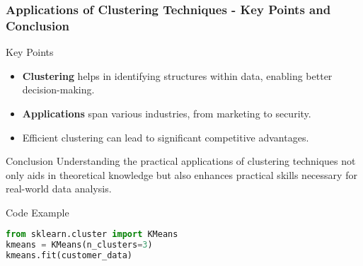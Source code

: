 \documentclass[aspectratio=169]{beamer}
\begin{document}
\begin{frame}[fragile]
    \frametitle{Applications of Clustering Techniques - Key Points and Conclusion}
    \begin{block}{Key Points}
        \begin{itemize}
            \item \textbf{Clustering} helps in identifying structures within data, enabling better decision-making.
            \item \textbf{Applications} span various industries, from marketing to security.
            \item Efficient clustering can lead to significant competitive advantages.
        \end{itemize}
    \end{block}

    \begin{block}{Conclusion}
        Understanding the practical applications of clustering techniques not only aids in theoretical knowledge but also enhances practical skills necessary for real-world data analysis.
    \end{block}

    \begin{block}{Code Example}
        \begin{lstlisting}[language=Python]
from sklearn.cluster import KMeans
kmeans = KMeans(n_clusters=3)
kmeans.fit(customer_data)
        \end{lstlisting}
    \end{block}
\end{frame}
\end{document}
